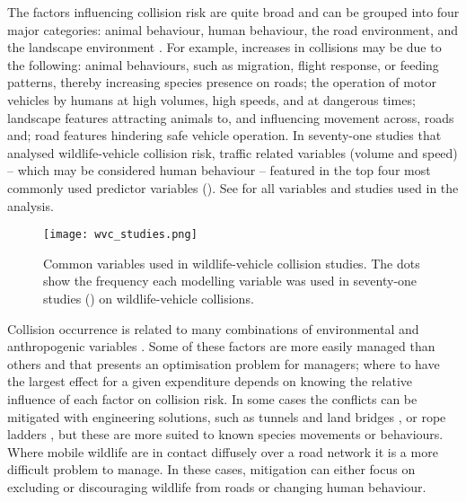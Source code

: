 The factors influencing collision risk are quite broad and can be grouped into four major categories: animal behaviour, human behaviour, the road environment, and the landscape environment \citep{form03}. For example, increases in collisions may be due to the following: animal behaviours, such as migration, flight response, or feeding patterns, thereby increasing species presence on roads; the operation of motor vehicles by humans at high volumes, high speeds, and at dangerous times; landscape features attracting animals to, and influencing movement across, roads and; road features hindering safe vehicle operation. In seventy-one studies that analysed wildlife-vehicle collision risk, traffic related variables (volume and speed) -- which may be considered human behaviour -- featured in the top four most commonly used predictor variables (). See  for all variables and studies used in the analysis.

\begin{figure*}[!t]
  \centering
  \texttt{[image: wvc\_studies.png]}
  \caption[Variables used in wildlife-vehicle collision studies]{Common variables used in wildlife-vehicle collision studies. The dots show the frequency each modelling variable was used in seventy-one studies () on wildlife-vehicle collisions.}
  \label{wvc_studies}
\end{figure*}

Collision occurrence is related to many combinations of environmental and anthropogenic variables \citep{barn07}. Some of these factors are more easily managed than others and that presents an optimisation problem for managers; where to have the largest effect for a given expenditure depends on knowing the relative influence of each factor on collision risk. In some cases the conflicts can be mitigated with engineering solutions, such as tunnels and land bridges \citep{bond08}, or rope ladders \citep{soan13}, but these are more suited to known species movements or behaviours. Where mobile wildlife are in contact diffusely over a road network it is a more difficult problem to manage. In these cases, mitigation can either focus on excluding or discouraging wildlife from roads or changing human behaviour.

